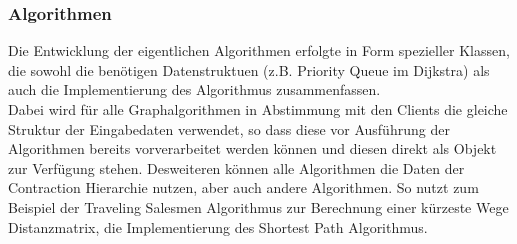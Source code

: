 \subsubsection*{Algorithmen}
Die Entwicklung der eigentlichen Algorithmen erfolgte in Form spezieller Klassen, die sowohl die benötigen Datenstruktuen (z.B. Priority Queue im Dijkstra) als auch die Implementierung des Algorithmus zusammenfassen.\\
Dabei wird für alle Graphalgorithmen in Abstimmung mit den Clients die gleiche Struktur der Eingabedaten verwendet, so dass diese vor Ausführung der Algorithmen bereits vorverarbeitet werden können und diesen direkt als Objekt zur Verfügung stehen. Desweiteren können alle Algorithmen die Daten der Contraction Hierarchie nutzen, aber auch andere Algorithmen. So nutzt zum Beispiel der Traveling Salesmen Algorithmus zur Berechnung einer kürzeste Wege Distanzmatrix, die Implementierung des Shortest Path Algorithmus.\\
